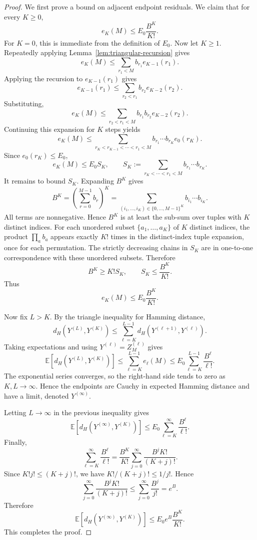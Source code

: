 \documentclass{article}
\begin{document}
\begin{proof}
We first prove a bound on adjacent endpoint residuals. We claim that for every $K\ge0$,
\[
e_K(M)\le E_0\frac{B^K}{K!}.
\]
For $K=0$, this is immediate from the definition of $E_0$. Now let $K\ge1$. Repeatedly applying Lemma~\ref{lem:triangular-recursion} gives
\[
e_K(M)
\le
\sum_{r_1<M}b_{r_1}e_{K-1}(r_1).
\]
Applying the recursion to $e_{K-1}(r_1)$ gives
\[
e_{K-1}(r_1)
\le
\sum_{r_2<r_1}b_{r_2}e_{K-2}(r_2).
\]
Substituting,
\[
e_K(M)
\le
\sum_{r_2<r_1<M}b_{r_1}b_{r_2}e_{K-2}(r_2).
\]
Continuing this expansion for $K$ steps yields
\[
e_K(M)
\le
\sum_{r_K<r_{K-1}<\cdots<r_1<M} b_{r_1}\cdots b_{r_K} e_0(r_K).
\]
Since $e_0(r_K)\le E_0$,
\[
e_K(M)
\le
E_0 S_K,
\qquad
S_K:=\sum_{r_K<\cdots<r_1<M} b_{r_1}\cdots b_{r_K}.
\]
It remains to bound $S_K$. Expanding $B^K$ gives
\[
B^K=\left(\sum_{r=0}^{M-1}b_r\right)^K
=\sum_{(i_1,\ldots,i_K)\in\{0,\ldots,M-1\}^K} b_{i_1}\cdots b_{i_K}.
\]
All terms are nonnegative. Hence $B^K$ is at least the sub-sum over tuples with $K$ distinct indices. For each unordered subset $\{a_1,\ldots,a_K\}$ of $K$ distinct indices, the product $\prod_{a}b_a$ appears exactly $K!$ times in the distinct-index tuple expansion, once for each permutation. The strictly decreasing chains in $S_K$ are in one-to-one correspondence with these unordered subsets. Therefore
\[
B^K\ge K!S_K,
\qquad
S_K\le \frac{B^K}{K!}.
\]
Thus
\[
e_K(M)\le E_0\frac{B^K}{K!}.
\]

Now fix $L>K$. By the triangle inequality for Hamming distance,
\[
d_H(Y^{(L)},Y^{(K)})
\le
\sum_{\ell=K}^{L-1}d_H(Y^{(\ell+1)},Y^{(\ell)}).
\]
Taking expectations and using $Y^{(\ell)}=Z_M^{(\ell)}$ gives
\[
\mathbb E[d_H(Y^{(L)},Y^{(K)})]
\le
\sum_{\ell=K}^{L-1}e_\ell(M)
\le
E_0\sum_{\ell=K}^{L-1}\frac{B^\ell}{\ell!}.
\]
The exponential series converges, so the right-hand side tends to zero as $K,L\to\infty$. Hence the endpoints are Cauchy in expected Hamming distance and have a limit, denoted $Y^{(\infty)}$.

Letting $L\to\infty$ in the previous inequality gives
\[
\mathbb E[d_H(Y^{(\infty)},Y^{(K)})]
\le
E_0\sum_{\ell=K}^{\infty}\frac{B^\ell}{\ell!}.
\]
Finally,
\[
\sum_{\ell=K}^{\infty}\frac{B^\ell}{\ell!}
=
\frac{B^K}{K!}\sum_{j=0}^{\infty}\frac{B^j K!}{(K+j)!}.
\]
Since $K!j!\le (K+j)!$, we have $K!/(K+j)!\le1/j!$. Hence
\[
\sum_{j=0}^{\infty}\frac{B^j K!}{(K+j)!}
\le
\sum_{j=0}^{\infty}\frac{B^j}{j!}
=e^B.
\]
Therefore
\[
\mathbb E[d_H(Y^{(\infty)},Y^{(K)})]
\le
E_0 e^B\frac{B^K}{K!}.
\]
This completes the proof.
\end{proof}
\end{document}
